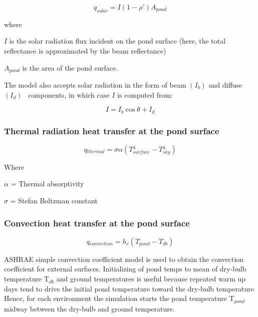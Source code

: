 \begin{equation}
{q_{solar}} = I\left( {1 - \rho '} \right){A_{pond}}
\end{equation}

where

\(I\) is the solar radiation flux incident on the pond surface (here, the total reflectance is approximated by the beam reflectance)

\({A_{pond}}\) is the area of the pond surface.

The model also accepts solar radiation in the form of beam \(\left( {{I_b}} \right)\) and diffuse \(\left( {{I_d}} \right)\) ~components, in which case \(I\) is computed from:

\begin{equation}
I = {I_b}\cos \theta  + {I_d}
\end{equation}

\subsubsection{Thermal radiation heat transfer at the pond surface}\label{thermal-radiation-heat-transfer-at-the-pond-surface}

\begin{equation}
q{}_{thermal} = \sigma \alpha (T{{}_{surface}^4} - T{{}_{sky}^4})
\end{equation}

Where

\(\alpha\) = Thermal absorptivity

\(\sigma\) = Stefan Boltzman constant

\subsubsection{Convection heat transfer at the pond surface}\label{convection-heat-transfer-at-the-pond-surface}

\begin{equation}
q{}_{convection} = h{}_c(T{}_{pond} - T{}_{db})
\end{equation}

ASHRAE simple convection coefficient model is used to obtain the convection coefficient for external surfaces. Initializing of pond temps to mean of dry-bulb temperature T\(_{db}\) and ground temperatures is useful because repeated warm up days tend to drive the initial pond temperature toward the dry-bulb temperature Hence, for each environment the simulation starts the pond temperature T\(_{pond}\) midway between the dry-bulb and ground temperature.

